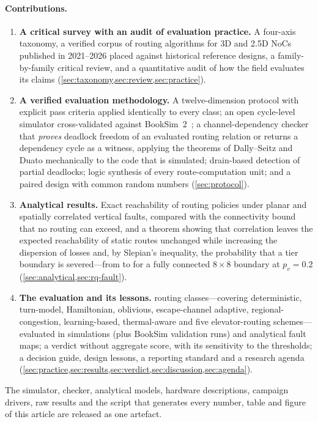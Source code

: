 \paragraph{Contributions.}
\begin{enumerate}[label=\textbf{C\arabic*.},leftmargin=*]
  \item \textbf{A critical survey with an audit of evaluation practice.} A four-axis taxonomy, a verified corpus of  routing algorithms for 3D and 2.5D NoCs published in 2021--2026 placed against  historical reference designs, a family-by-family critical review, and a quantitative audit of how the field evaluates its claims (\cref{sec:taxonomy,sec:review,sec:practice}).
  \item \textbf{A verified evaluation methodology.} A twelve-dimension protocol with explicit pass criteria applied identically to every class; an open cycle-level simulator cross-validated against BookSim~2~\cite{jiang2013booksim}; a channel-dependency checker that \emph{proves} deadlock freedom of an evaluated routing relation or returns a dependency cycle as a witness, applying the theorems of Dally--Seitz and Duato mechanically to the code that is simulated; drain-based detection of partial deadlocks; logic synthesis of every route-computation unit; and a paired design with common random numbers (\cref{sec:protocol}).
  \item \textbf{Analytical results.} Exact reachability of  routing policies under planar and spatially correlated vertical faults, compared with the connectivity bound that no routing can exceed, and a theorem showing that correlation leaves the expected reachability of static routes unchanged while increasing the dispersion of losses and, by Slepian's inequality, the probability that a tier boundary is severed---from  to  for a fully connected $8\times8$ boundary at $p_v=0.2$ (\cref{sec:analytical,sec:rq-fault}).
  \item \textbf{The evaluation and its lessons.}  routing classes---covering deterministic, turn-model, Hamiltonian, oblivious, escape-channel adaptive, regional-congestion, learning-based, thermal-aware and five elevator-routing schemes---evaluated in  simulations (plus  BookSim validation runs) and  analytical fault maps; a verdict without aggregate score, with its sensitivity to the thresholds; a decision guide, design lessons, a reporting standard and a research agenda (\cref{sec:practice,sec:results,sec:verdict,sec:discussion,sec:agenda}).
\end{enumerate}
The simulator, checker, analytical models, hardware descriptions, campaign drivers, raw results and the script that generates every number, table and figure of this article are released as one artefact.

